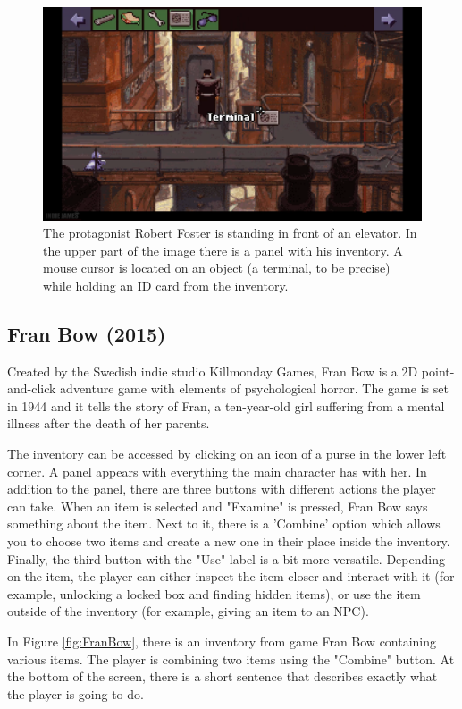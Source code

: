 \begin{figure}[H]
\centering
\includegraphics[width=1.\linewidth]{img/BaSS.png}
\caption{The protagonist Robert Foster is standing in front of an elevator. In the upper part of the image there is a panel with his inventory. A mouse cursor is located on an object (a terminal, to be precise) while holding an ID card from the inventory.}
\label{fig:BaSS}
\end{figure}

\subsection{Fran Bow (2015)}
Created by the Swedish indie studio Killmonday Games, Fran Bow is a 2D point-and-click adventure game with elements of psychological horror. The game is set in 1944 and it tells the story of Fran, a ten-year-old girl suffering from a mental illness after the death of her parents.

The inventory can be accessed by clicking on an icon of a purse in the lower left corner. A panel appears with everything the main character has with her. In addition to the panel, there are three buttons with different actions the player can take. When an item is selected and "Examine" is pressed, Fran Bow says something about the item. Next to it, there is a 'Combine' option which allows you to choose two items and create a new one in their place inside the inventory. Finally, the third button with the "Use" label is a bit more versatile. Depending on the item, the player can either inspect the item closer and interact with it (for example, unlocking a locked box and finding hidden items), or use the item outside of the inventory (for example, giving an item to an NPC).

In Figure \ref{fig:FranBow}, there is an inventory from game Fran Bow containing various items. The player is combining two items using the "Combine" button. At the bottom of the screen, there is a short sentence that describes exactly what the player is going to do.

